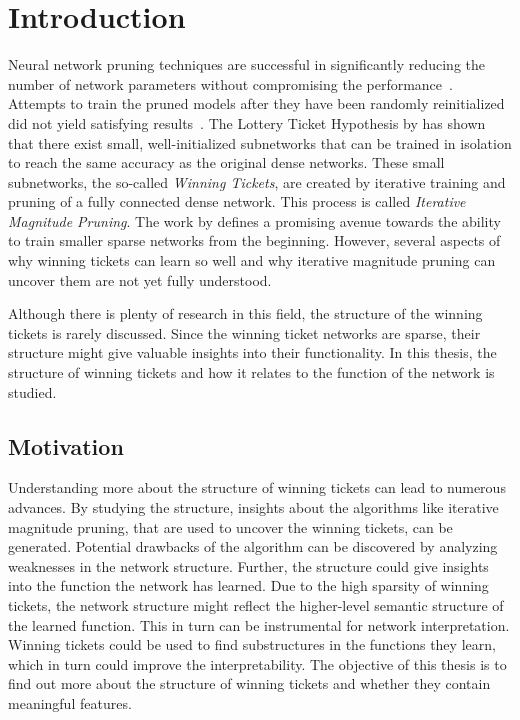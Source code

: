 \chapter{Introduction}
Neural network pruning techniques are successful in significantly reducing the number of network parameters without compromising the performance~\autocite{OptimalBrainDamage, OptimalBrainSurgeon}.  
Attempts to train the pruned models after they have been randomly reinitialized did not yield satisfying results~\autocite{HanEtAl15, PruningFiltersForEfficientConvets}.
The Lottery Ticket Hypothesis by \textcite{LTH} has shown that there exist small, well-initialized subnetworks that can be trained in isolation to reach the same accuracy as the original dense networks.
These small subnetworks, the so-called \textit{Winning Tickets}, are created by iterative training and pruning of a fully connected dense network.
This process is called \textit{Iterative Magnitude Pruning}.
The work by \textcite{LTH} defines a promising avenue towards the ability to train smaller sparse networks from the beginning.
However, several aspects of why winning tickets can learn so well and why iterative magnitude pruning can uncover them are not yet fully understood.

Although there is plenty of research in this field, the structure of the winning tickets is rarely discussed.
Since the winning ticket networks are sparse, their structure might give valuable insights into their functionality.
In this thesis, the structure of winning tickets and how it relates to the function of the network is studied.

\section{Motivation}
Understanding more about the structure of winning tickets can lead to numerous advances.
By studying the structure, insights about the algorithms like iterative magnitude pruning, that are used to uncover the winning tickets, can be generated.
Potential drawbacks of the algorithm can be discovered by analyzing weaknesses in the network structure.
Further, the structure could give insights into the function the network has learned.
Due to the high sparsity of winning tickets, the network structure might reflect the higher-level semantic structure of the learned function.
This in turn can be instrumental for network interpretation.
Winning tickets could be used to find substructures in the functions they learn, which in turn could improve the interpretability.
The objective of this thesis is to find out more about the structure of winning tickets and whether they contain meaningful features.

